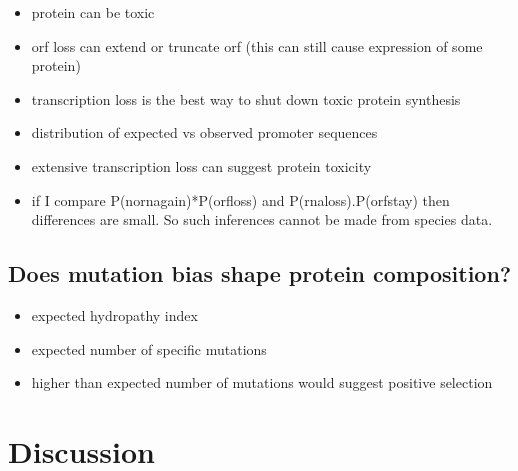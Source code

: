 \documentclass[12pt,a4paper]{article}
\begin{document}
\begin{itemize}
\item protein can be toxic
\item orf loss can extend or truncate orf (this can still cause expression of some protein)
\item transcription loss is the best way to shut down toxic protein synthesis
\item distribution of expected vs observed promoter sequences
\item extensive transcription loss can suggest protein toxicity
\item if I compare P(nornagain)*P(orfloss) and P(rnaloss).P(orfstay) then differences are small. So such inferences cannot be made from species data.
\end{itemize}

\subsection{Does mutation bias shape protein composition?}

\begin{itemize}
\item expected hydropathy index
\item expected number of specific mutations
\item higher than expected number of mutations would suggest positive selection
\end{itemize}

\section{Discussion} 
\end{document}
